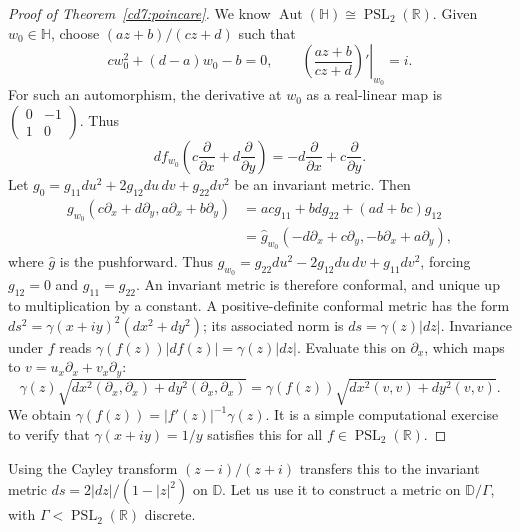 \documentclass[11pt,a4paper]{article}
\begin{document}
\begin{proof}[Proof of Theorem~\ref{cd7:poincare}]
We know $\operatorname{Aut}(\mathbb H)\cong\operatorname{PSL}_2(\mathbb R)$. Given $w_0\in\mathbb H$, choose $(az+b)/(cz+d)$ such that
\[
cw_0^2+(d-a)w_0-b=0,\qquad
\left.\left(\frac{az+b}{cz+d}\right)'\right|_{w_0}=i.
\]
For such an automorphism, the derivative at $w_0$ as a real-linear map is $\begin{pmatrix}0&-1\\1&0\end{pmatrix}$. Thus
\[
df_{w_0}\left(c\frac\partial{\partial x}+d\frac\partial{\partial y}\right)
=-d\frac\partial{\partial x}+c\frac\partial{\partial y}.
\]
Let $g_0=g_{11}du^2+2g_{12}du\,dv+g_{22}dv^2$ be an invariant metric. Then
\begin{align*}
g_{w_0}\left(c\partial_x+d\partial_y,a\partial_x+b\partial_y\right)
&=acg_{11}+bdg_{22}+(ad+bc)g_{12}\\
&=\widehat g_{w_0}\left(-d\partial_x+c\partial_y,-b\partial_x+a\partial_y\right),
\end{align*}
where $\widehat g$ is the pushforward. Thus
$\widehat g_{w_0}=g_{22}du^2-2g_{12}du\,dv+g_{11}dv^2$, forcing $g_{12}=0$ and $g_{11}=g_{22}$. An invariant metric is therefore conformal, and unique up to multiplication by a constant.
A positive-definite conformal metric has the form $ds^2=\gamma(x+iy)^2(dx^2+dy^2)$; its associated norm is $ds=\gamma(z)|dz|$. Invariance under $f$ reads $\gamma(f(z))|df(z)|=\gamma(z)|dz|$. Evaluate this on $\partial_x$, which maps to $v=u_x\partial_x+v_x\partial_y$:
\[
\gamma(z)\sqrt{dx^2(\partial_x,\partial_x)+dy^2(\partial_x,\partial_x)}
=\gamma(f(z))\sqrt{dx^2(v,v)+dy^2(v,v)}.
\]
We obtain $\gamma(f(z))=|f'(z)|^{-1}\gamma(z)$. It is a simple computational exercise to verify that $\gamma(x+iy)=1/y$ satisfies this for all $f\in\operatorname{PSL}_2(\mathbb R)$.
\end{proof}
Using the Cayley transform $(z-i)/(z+i)$ transfers this to the invariant metric
$ds=2|dz|/(1-|z|^2)$ on $\mathbb D$. Let us use it to construct a metric on $\mathbb D/\Gamma$, with $\Gamma<\operatorname{PSL}_2(\mathbb R)$ discrete.
\end{document}
